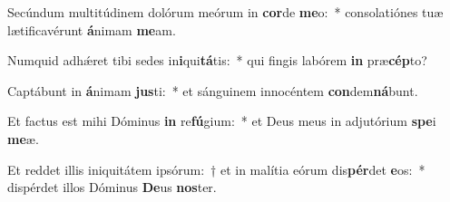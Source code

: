 \item Secúndum multitúdinem dolórum meórum in \textbf{cor}de \textbf{me}o:~* consolatiónes tuæ lætificavérunt \textbf{á}nimam \textbf{me}am.
\item Numquid adhǽret tibi sedes in\textbf{i}qui\textbf{tá}tis:~* qui fingis labórem \textbf{in} præ\textbf{cép}to?
\item Captábunt in \textbf{á}nimam \textbf{jus}ti:~* et sánguinem innocéntem \textbf{con}dem\textbf{ná}bunt.
\item Et factus est mihi Dóminus \textbf{in} re\textbf{fú}gium:~* et Deus meus in adjutórium \textbf{spe}i \textbf{me}æ.
\item Et reddet illis iniquitátem ipsórum:~† et in malítia eórum dis\textbf{pér}det \textbf{e}os:~* dispérdet illos Dóminus \textbf{De}us \textbf{nos}ter.
